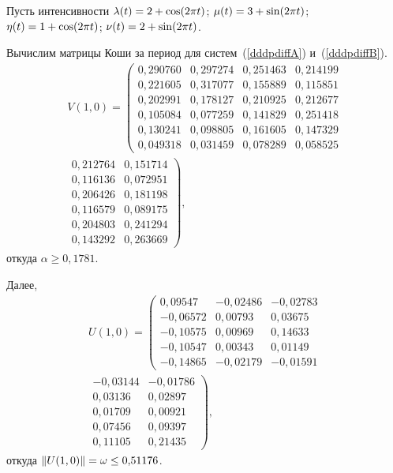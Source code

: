 \begin{multicols}{2}
Пусть интенсивности $\lambda(t)\hm=2\hm+\cos(2\pi t)$; 
$\mu(t)\hm=3\hm+\sin(2 \pi t)$;
$\eta(t)\hm=1\hm+\cos(2 \pi t)$; $\nu(t)\hm=2\hm+\sin(2 \pi t)$.

\pagebreak

Вычислим матрицы Коши за период для сис\-тем~(\ref{dddpdiffA}) 
и~(\ref{dddpdiffB}).
\begin{multline*} 
V(1,0)=
\left(
\begin{array}{cccc}
 0{,}290760 & 0{,}297274 & 0{,}251463 & 0{,}214199\\ 
 0{,}221605 & 0{,}317077 & 0{,}155889 & 0{,}115851 \\
 0{,}202991 & 0{,}178127 & 0{,}210925 & 0{,}212677 \\
 0{,}105084 & 0{,}077259 & 0{,}141829 & 0{,}251418 \\
 0{,}130241 & 0{,}098805 & 0{,}161605 & 0{,}147329 \\
 0{,}049318 & 0{,}031459 & 0{,}078289 & 0{,}058525 
\end{array}\right.\\
\left.
 \begin{array}{cc}   
       0{,}212764 & 0{,}151714\\   
 0{,}116136 & 0{,}072951\\  
 0{,}206426 & 0{,}181198\\  
 0{,}116579 & 0{,}089175\\  
 0{,}204803 & 0{,}241294\\  
 0{,}143292 & 0{,}263669
\end{array}
\right),
\end{multline*}
откуда $ \alpha \ge 0{,}1781$.

Далее,
\begin{multline*} 
U(1,0)=
\left(
\begin{array}{ccc}
0{,}09547 & -0{,}02486 & -0{,}02783\\    
-0{,}06572 & 0{,}00793 & 0{,}03675 \\      
-0{,}10575 & 0{,}00969 & 0{,}14633  \\     
-0{,}10547 & 0{,}00343 & 0{,}01149 \\      
-0{,}14865 & -0{,}02179 & -0{,}01591   
\end{array}   \right.\\
\left.
\begin{array}{cc}
 -0{,}03144 & -0{,}01786\\ 
 0{,}03136 & 0{,}02897\\       
 0{,}01709 & 0{,}00921\\       
 0{,}07456 & 0{,}09397\\       
 0{,}11105 & 0{,}21435
\end{array}
\right),
\end{multline*}
откуда $\|U(1,0)\| =\omega \hm\le 0{,}51176$.


\end{multicols}
